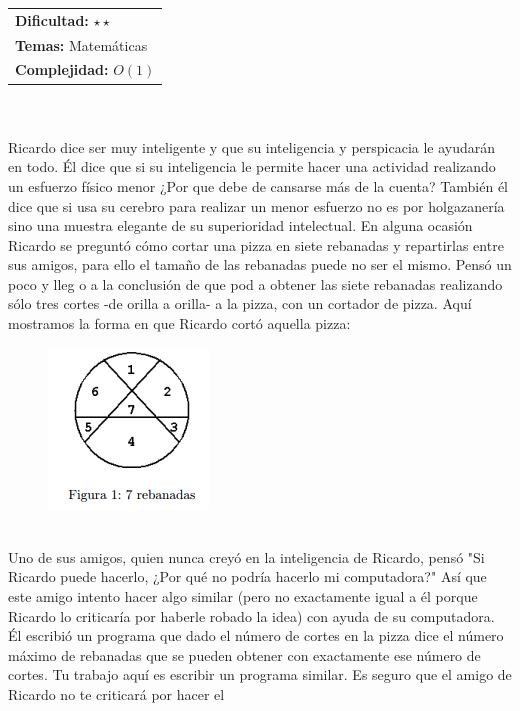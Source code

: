\documentclass[12pt]{article}
\begin{document}
\hfill
\begin{tabular}{@{}l@{}}
\textbf{Dificultad:} $\star \star$ \\
\textbf{Temas:} Matemáticas\\
\textbf{Complejidad:} $O(1)$
\end{tabular}
\\
\\Ricardo dice ser muy inteligente y que su inteligencia y perspicacia le ayudar\'an en todo. \'El dice que si su
inteligencia le permite hacer una actividad realizando un esfuerzo f\'isico menor ¿Por que debe de cansarse m\'as de
la cuenta? Tambi\'en \'el dice que si usa su cerebro para realizar un menor esfuerzo no es por holgazaner\'ia sino una
muestra elegante de su superioridad intelectual.
En alguna ocasi\'on Ricardo se pregunt\'o c\'omo cortar una pizza en siete rebanadas y repartirlas entre sus amigos,
para ello el tamaño de las rebanadas puede no ser el mismo. Pens\'o un poco y lleg o a la conclusi\'on de que pod  a
obtener las siete rebanadas realizando s\'olo tres cortes -de orilla a orilla- a la pizza, con un cortador de pizza.
Aqu\'i mostramos la forma en que Ricardo cort\'o aquella pizza:
\\
\begin{figure}[h!] 
\begin{center} 
\includegraphics[scale = 1.0]{reb.PNG}\hspace{50mm}  
\end{center} 
\end{figure}
\\
Uno de sus amigos, quien nunca crey\'o en la inteligencia de Ricardo, pens\'o "Si Ricardo puede hacerlo, ¿Por qu\'e no
podr\'ia hacerlo mi computadora?" As\'i que este amigo intento hacer algo similar (pero no exactamente igual a \'el
porque Ricardo lo criticar\'ia por haberle robado la idea) con ayuda de su computadora. \'El escribi\'o un programa que
dado el n\'umero de cortes en la pizza dice el n\'umero m\'aximo de rebanadas que se pueden obtener con exactamente
ese n\'umero de cortes.
Tu trabajo aqu\'i es escribir un programa similar. Es seguro que el amigo de Ricardo no te criticar\'a por hacer el
\end{document}
